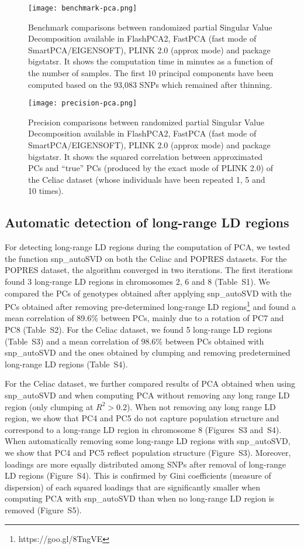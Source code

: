 \documentclass{bioinfo}
\begin{document}
\begin{figure}[!tpb]
\centerline{\texttt{[image: benchmark-pca.png]}}
\caption{Benchmark comparisons between randomized partial Singular Value Decomposition available in FlashPCA2, FastPCA (fast mode of SmartPCA/EIGENSOFT), PLINK 2.0 (approx mode) and package bigstatsr. It shows the computation time in minutes as a function of the number of samples. The first 10 principal components have been computed based on the 93,083 SNPs which remained after thinning.}\label{fig:bench-pca}
\end{figure}

\begin{figure}[!tpb]
\centerline{\texttt{[image: precision-pca.png]}}
\caption{Precision comparisons between randomized partial Singular Value Decomposition available in FlashPCA2, FastPCA (fast mode of SmartPCA/EIGENSOFT), PLINK 2.0 (approx mode) and package bigstatsr. It shows the squared correlation between approximated PCs and ``true'' PCs (produced by the exact mode of PLINK 2.0) of the Celiac dataset (whose individuals have been repeated 1, 5 and 10 times).}\label{fig:prec-pca}
\end{figure}

\subsection{Automatic detection of long-range LD regions}

For detecting long-range LD regions during the computation of PCA, we tested the function snp\_autoSVD on both the Celiac and POPRES datasets. For the POPRES dataset, the algorithm converged in two iterations. The first iterations found 3 long-range LD regions in chromosomes 2, 6 and 8 (Table~S1). 
We compared the PCs of genotypes obtained after applying snp\_autoSVD with the PCs obtained after removing pre-determined long-range LD regions\footnote{https://goo.gl/8TngVE} and found a mean correlation of 89.6\% between PCs, mainly due to a rotation of PC7 and PC8 (Table~S2). 
For the Celiac dataset, we found 5 long-range LD regions (Table~S3) and a mean correlation of 98.6\% between PCs obtained with snp\_autoSVD and the ones obtained by clumping and removing predetermined long-range LD regions (Table~S4).

For the Celiac dataset, we further compared results of PCA obtained when using snp\_autoSVD and when computing PCA without removing any long range LD region (only clumping at $R^2 > 0.2$). 
When not removing any long range LD region, we show that PC4 and PC5 do not capture population structure and correspond to a long-range LD region in chromosome 8 (Figures~S3 and~S4). 
When automatically removing some long-range LD regions with snp\_autoSVD, we show that PC4 and PC5 reflect population structure (Figure~S3). Moreover, loadings are more equally distributed among SNPs after removal of long-range LD regions (Figure~S4). 
This is confirmed by Gini coefficients (measure of dispersion) of each squared loadings that are significantly smaller when computing PCA with snp\_autoSVD than when no long-range LD region is removed (Figure~S5).
\end{document}
